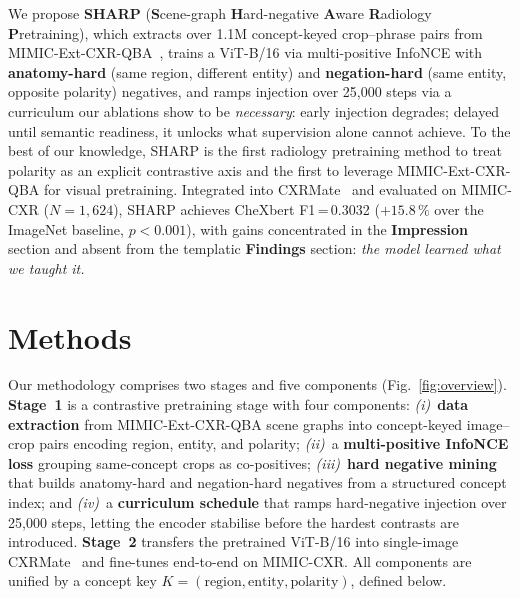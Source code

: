 \documentclass[runningheads]{llncs}
\begin{document}
\begin{sloppypar}
We propose \textbf{SHARP} (\textbf{S}cene-graph \textbf{H}ard-negative
\textbf{A}ware \textbf{R}adiology \textbf{P}retraining), which extracts
over 1.1M concept-keyed crop--phrase pairs from
MIMIC-Ext-CXR-QBA~\cite{mimicextcxrqba}, trains a ViT-B/16 via
multi-positive InfoNCE with \textbf{anatomy-hard} (same region,
different entity) and \textbf{negation-hard} (same entity, opposite
polarity) negatives, and ramps injection over 25,000 steps via a
curriculum our ablations show to be \emph{necessary}: early injection
degrades; delayed until semantic readiness, it unlocks what supervision
alone cannot achieve.
To the best of our knowledge, SHARP is the first radiology pretraining
method to treat polarity as an explicit contrastive axis and the first
to leverage MIMIC-Ext-CXR-QBA for visual pretraining.
Integrated into CXRMate~\cite{cxrmate} and evaluated on MIMIC-CXR
($N{=}1{,}624$), SHARP achieves CheXbert F1\,=\,0.3032
($+15.8\,\%$ over the ImageNet baseline, $p{<}0.001$), with gains
concentrated in the \textbf{Impression} section and absent from the
templatic \textbf{Findings} section: \emph{the model learned what we taught it.}
\end{sloppypar}

\section{Methods}
\label{sec:methods}

Our methodology comprises two stages and five components
(Fig.~\ref{fig:overview}).
\textbf{Stage~1} is a contrastive pretraining stage with four
components: \textit{(i)}~\textbf{data extraction} from
MIMIC-Ext-CXR-QBA scene graphs into concept-keyed image--crop pairs
encoding region, entity, and polarity; \textit{(ii)}~a
\textbf{multi-positive InfoNCE loss} grouping same-concept crops as
co-positives; \textit{(iii)}~\textbf{hard negative mining} that builds
anatomy-hard and negation-hard negatives from a structured concept
index; and \textit{(iv)}~a \textbf{curriculum schedule} that ramps
hard-negative injection over 25{,}000 steps, letting the encoder
stabilise before the hardest contrasts are introduced.
\textbf{Stage~2} transfers the pretrained ViT-B/16 into single-image
CXRMate~\cite{cxrmate} and fine-tunes end-to-end on MIMIC-CXR.
All components are unified by a concept key
$K{=}(\text{region},\text{entity},\text{polarity})$, defined below.
\end{document}
